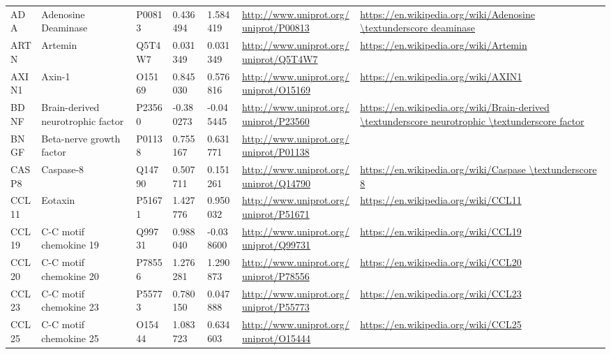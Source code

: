 \begin{table}[H]
\begin{tabular}{ lllllll }
        \multicolumn{1}{l|}{ ADA } &  Adenosine Deaminase   & P00813   & 0.436494   & 1.584419   & \url{http://www.uniprot.org/uniprot/P00813}   & \url{https://en.wikipedia.org/wiki/Adenosine \textunderscore deaminase}          \\ 
        \multicolumn{1}{l|}{ ARTN } &  Artemin   & Q5T4W7   & 0.031349   & 0.031349   & \url{http://www.uniprot.org/uniprot/Q5T4W7}   & \url{https://en.wikipedia.org/wiki/Artemin}          \\ 
        \multicolumn{1}{l|}{ AXIN1 } &  Axin-1   & O15169   & 0.845030   & 0.576816   & \url{http://www.uniprot.org/uniprot/O15169}   & \url{https://en.wikipedia.org/wiki/AXIN1}          \\ 
        \multicolumn{1}{l|}{ BDNF } &  Brain-derived neurotrophic factor   & P23560   & -0.380273   & -0.045445   & \url{http://www.uniprot.org/uniprot/P23560}   & \url{https://en.wikipedia.org/wiki/Brain-derived \textunderscore neurotrophic \textunderscore factor}          \\ 
        \multicolumn{1}{l|}{ BNGF } &  Beta-nerve growth factor   & P01138   & 0.755167   & 0.631771   & \url{http://www.uniprot.org/uniprot/P01138}   &           \\ 
        \multicolumn{1}{l|}{ CASP8 } &  Caspase-8   & Q14790   & 0.507711   & 0.151261   & \url{http://www.uniprot.org/uniprot/Q14790}   & \url{https://en.wikipedia.org/wiki/Caspase \textunderscore 8}          \\ 
        \multicolumn{1}{l|}{ CCL11 } &  Eotaxin   & P51671   & 1.427776   & 0.950032   & \url{http://www.uniprot.org/uniprot/P51671}   & \url{https://en.wikipedia.org/wiki/CCL11}          \\ 
        \multicolumn{1}{l|}{ CCL19 } &  C-C motif chemokine 19   & Q99731   & 0.988040   & -0.038600   & \url{http://www.uniprot.org/uniprot/Q99731}   & \url{https://en.wikipedia.org/wiki/CCL19}          \\ 
        \multicolumn{1}{l|}{ CCL20 } &  C-C motif chemokine 20   & P78556   & 1.276281   & 1.290873   & \url{http://www.uniprot.org/uniprot/P78556}   & \url{https://en.wikipedia.org/wiki/CCL20}          \\ 
        \multicolumn{1}{l|}{ CCL23 } &  C-C motif chemokine 23   & P55773   & 0.780150   & 0.047888   & \url{http://www.uniprot.org/uniprot/P55773}   & \url{https://en.wikipedia.org/wiki/CCL23}          \\ 
        \multicolumn{1}{l|}{ CCL25 } &  C-C motif chemokine 25   & O15444   & 1.083723   & 0.634603   & \url{http://www.uniprot.org/uniprot/O15444}   & \url{https://en.wikipedia.org/wiki/CCL25}          \\ 

\end{tabular}
\end{table}
